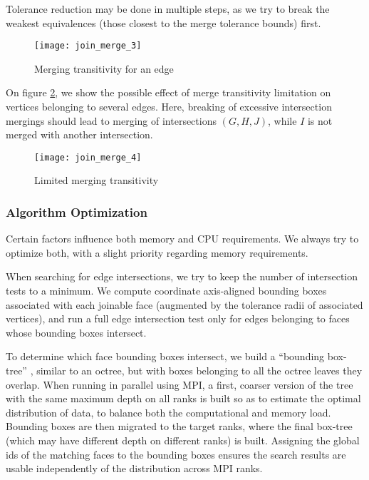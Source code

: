 Tolerance reduction may be done in multiple steps, as we
try to break the weakest equivalences (those closest to
the merge tolerance bounds) first.

\begin{figure}[!h]
\centerline{
\texttt{[image: join\_merge\_3]}}
\caption{Merging transitivity for an edge}
\label{fig:algo.merging.pb_2}
\end{figure}

On figure \ref{fig:algo.merging.pb_3}, we show the possible
effect of merge transitivity limitation on vertices belonging to several edges.
Here, breaking of excessive intersection mergings should lead to
merging of intersections $(G, H, J)$, while $I$ is not merged
with another intersection.

\begin{figure}[!h]
\centerline{
\texttt{[image: join\_merge\_4]}}
\caption{Limited merging transitivity}
\label{fig:algo.merging.pb_3}
\end{figure}

\subsubsection*{Algorithm Optimization\label{sec:join.optim}}

Certain factors influence both memory and CPU requirements. We always
try to optimize both, with a slight priority regarding memory
requirements.

When searching for edge intersections, we try to keep the number of intersection
tests to a minimum. We compute coordinate axis-aligned bounding boxes associated
with each joinable face (augmented by the tolerance radii of associated
vertices), and run a full edge intersection test only for
edges belonging to faces whose bounding boxes intersect.

To determine which face bounding boxes intersect, we build a ``bounding
box-tree'' , similar to an octree, but with boxes belonging to all
the octree leaves they overlap. When running in parallel using MPI, a first,
coarser version of the tree with the same maximum depth on all ranks is built
so as to estimate the optimal distribution of data, to balance both the computational
and memory load. Bounding boxes are then migrated to the target ranks,
where the final box-tree (which may have different depth on different ranks)
is built. Assigning the global ids of the matching faces to the bounding boxes
ensures the search results are usable independently of the distribution
across MPI ranks.

